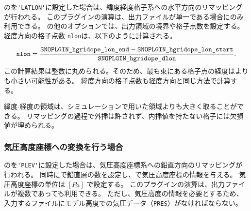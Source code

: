 のを\verb|'LATLON'|に設定した場合は、緯度経度格子系への水平方向のリマッピングが行われる。
このプラグインの演算は、出力ファイルが単一である場合にのみ利用できる。
の他のオプションでは、出力領域の境界や格子点数を設定する。
経度方向の格子点数 \verb|nlon|は、以下のように計算される。

\begin{eqnarray}
  \nmitemeq{nlon} = \frac{\nmitemeq{SNOPLGIN_hgridope_lon_end} - \nmitemeq{SNOPLGIN_hgridope_lon_start} }{\nmitemeq{SNOPLGIN_hgridope_dlon}} \nonumber.
\end{eqnarray}
\noindent
この計算結果は整数に丸められる。そのため、最も東にある格子点の経度はよりも小さい可能性がある。
緯度方向の格子点数も経度方向と同じ方法で計算する。

緯度-経度の領域は、シミュレーションで用いた領域よりも大きく取ることができる。
リマッピングの過程で外挿は許されず、内挿値を持たない格子には欠損値が埋められる。


\subsubsection{気圧高度座標への変換を行う場合}


のを\verb|'PLEV'|に設定した場合は、気圧高度座標系への鉛直方向のリマッピングが行われる。
同時にで鉛直層の数を設定し、で気圧高度座標の情報を与える。
気圧高度座標の単位は $[Pa]$ で設定する。
このプラグインの演算は、出力ファイルが複数であっても利用できる。
ただし、気圧高度の情報を必要とするため、入力するファイルにモデル高度での気圧データ（\verb|PRES|）がなければならない。
